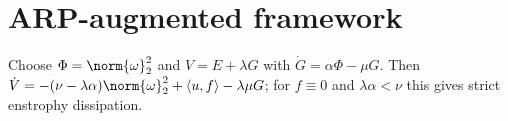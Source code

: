 \section{ARP-augmented framework}
Choose $\Phi=\norm{\omega}_2^2$ and $V=E+\lambda G$ with $\dot G=\alpha \Phi - \mu G$.
Then $\dot V=-(\nu-\lambda\alpha)\norm{\omega}_2^2 + \langle u,f\rangle - \lambda\mu G$; for $f\equiv0$ and $\lambda\alpha<\nu$ this gives strict enstrophy dissipation.
